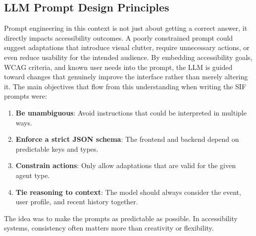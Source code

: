 \documentclass[openany]{book}
\begin{document}
\subsection{LLM Prompt Design Principles}
Prompt engineering in this context is not just about getting a correct answer, it directly impacts accessibility outcomes. A poorly constrained prompt could suggest adaptations that introduce visual clutter, require unnecessary actions, or even reduce usability for the intended audience. By embedding accessibility goals, WCAG criteria, and known user needs into the prompt, the LLM is guided toward changes that genuinely improve the interface rather than merely altering it.
The main objectives that flow from this understanding when writing the SIF prompts were:
\begin{enumerate}
    \item \textbf{Be unambiguous}: Avoid instructions that could be interpreted in multiple ways.
    \item \textbf{Enforce a strict JSON schema}: The frontend and backend depend on predictable keys and types.
    \item \textbf{Constrain actions}: Only allow adaptations that are valid for the given agent type.
    \item \textbf{Tie reasoning to context}: The model should always consider the event, user profile, and recent history together.
\end{enumerate}
The idea was to make the prompts as predictable as possible. In accessibility systems, consistency often matters more than creativity or flexibility.
\end{document}
